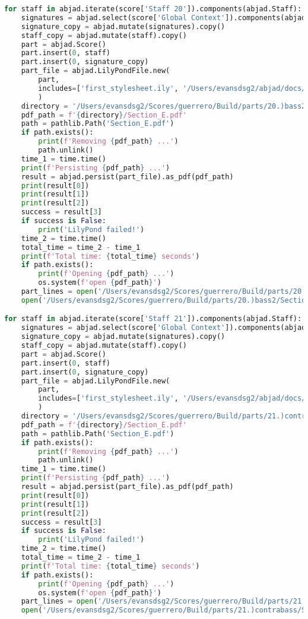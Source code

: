 \begin{lstlisting}[language=Python, caption=Invocation Source Code]
for staff in abjad.iterate(score['Staff 20']).components(abjad.Staff):
    signatures = abjad.select(score['Global Context']).components(abjad.Staff)
    signature_copy = abjad.mutate(signatures).copy()
    staff_copy = abjad.mutate(staff).copy()
    part = abjad.Score()
    part.insert(0, staff)
    part.insert(0, signature_copy)
    part_file = abjad.LilyPondFile.new(
        part,
        includes=['first_stylesheet.ily', '/Users/evansdsg2/abjad/docs/source/_stylesheets/abjad.ily'],
        )
    directory = '/Users/evansdsg2/Scores/guerrero/Build/parts/20.)bass2'
    pdf_path = f'{directory}/Section_E.pdf'
    path = pathlib.Path('Section_E.pdf')
    if path.exists():
        print(f'Removing {pdf_path} ...')
        path.unlink()
    time_1 = time.time()
    print(f'Persisting {pdf_path} ...')
    result = abjad.persist(part_file).as_pdf(pdf_path)
    print(result[0])
    print(result[1])
    print(result[2])
    success = result[3]
    if success is False:
        print('LilyPond failed!')
    time_2 = time.time()
    total_time = time_2 - time_1
    print(f'Total time: {total_time} seconds')
    if path.exists():
        print(f'Opening {pdf_path} ...')
        os.system(f'open {pdf_path}')
    part_lines = open('/Users/evansdsg2/Scores/guerrero/Build/parts/20.)bass2/Section_E.ly').readlines()
    open('/Users/evansdsg2/Scores/guerrero/Build/parts/20.)bass2/Section_E.ly', 'w').writelines(part_lines[15:-1])

for staff in abjad.iterate(score['Staff 21']).components(abjad.Staff):
    signatures = abjad.select(score['Global Context']).components(abjad.Staff)
    signature_copy = abjad.mutate(signatures).copy()
    staff_copy = abjad.mutate(staff).copy()
    part = abjad.Score()
    part.insert(0, staff)
    part.insert(0, signature_copy)
    part_file = abjad.LilyPondFile.new(
        part,
        includes=['first_stylesheet.ily', '/Users/evansdsg2/abjad/docs/source/_stylesheets/abjad.ily'],
        )
    directory = '/Users/evansdsg2/Scores/guerrero/Build/parts/21.)contrabass'
    pdf_path = f'{directory}/Section_E.pdf'
    path = pathlib.Path('Section_E.pdf')
    if path.exists():
        print(f'Removing {pdf_path} ...')
        path.unlink()
    time_1 = time.time()
    print(f'Persisting {pdf_path} ...')
    result = abjad.persist(part_file).as_pdf(pdf_path)
    print(result[0])
    print(result[1])
    print(result[2])
    success = result[3]
    if success is False:
        print('LilyPond failed!')
    time_2 = time.time()
    total_time = time_2 - time_1
    print(f'Total time: {total_time} seconds')
    if path.exists():
        print(f'Opening {pdf_path} ...')
        os.system(f'open {pdf_path}')
    part_lines = open('/Users/evansdsg2/Scores/guerrero/Build/parts/21.)contrabass/Section_E.ly').readlines()
    open('/Users/evansdsg2/Scores/guerrero/Build/parts/21.)contrabass/Section_E.ly', 'w').writelines(part_lines[15:-1])
\end{lstlisting}
